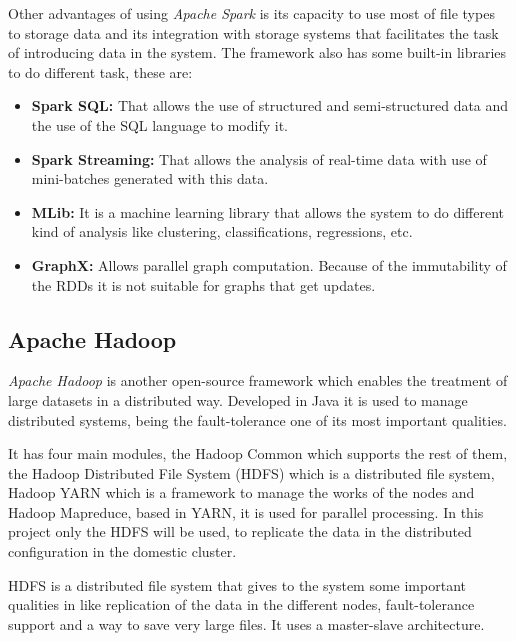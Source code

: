 Other advantages of using \textit{Apache Spark} is its capacity to use most of file types to storage data and its integration with storage systems that facilitates the task of introducing data in the system. The framework also has some built-in libraries to do different task, these are:

\begin{itemize}
\item \textbf{Spark SQL:} That allows the use of structured and semi-structured data and the use of the SQL language to modify it.
\item \textbf{Spark Streaming:} That allows the analysis of real-time data with use of mini-batches generated with this data.
\item \textbf{MLib:} It is a machine learning library that allows the system to do different kind of analysis like clustering, classifications, regressions, etc.
\item \textbf{GraphX:} Allows parallel graph computation. Because of the immutability of the \gls{RDD}s it is not suitable for graphs that get updates.
\end{itemize}

\subsection{Apache Hadoop}
\textit{Apache Hadoop} \cite{hadoop} is another open-source \gls{framework} which enables the treatment of large datasets in a distributed way. Developed in Java it is used to manage distributed systems, being the fault-tolerance one of its most important qualities. 

It has four main modules, the Hadoop Common which supports the rest of them, the Hadoop Distributed File System (\gls{HDFS}) which is a distributed file system, Hadoop YARN which is a framework to manage the works of the nodes and Hadoop Mapreduce, based in YARN, it is used for parallel processing. In this project only the HDFS will be used, to replicate the data in the distributed configuration in the domestic cluster.

\gls{HDFS} is a distributed file system that gives to the system some important qualities in like replication of the data in the different nodes, fault-tolerance support and a way to save very large files. It uses a master-slave architecture.

